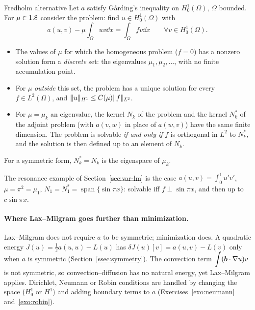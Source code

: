 \begin{gbox}{Fredholm alternative}
%
Let $a$ satisfy G\aa rding's inequality on $H^1_0(\Omega)$, $\Omega$ bounded.
For $\mu\in1.8$ consider the problem: find $u\in H^1_0(\Omega)$ with
\[
  a(u,v)-\mu\int_\Omega uv\dd x=\int_\Omega fv\dd x\qquad\forall v\in H^1_0(\Omega).
\]
\begin{itemize}
\item The values of $\mu$ for which the homogeneous problem ($f=0$) has a
nonzero solution form a \emph{discrete} set: the eigenvalues
$\mu_1,\mu_2,\dots$, with no finite accumulation point.
\item For $\mu$ \emph{outside} this set, the problem has a unique solution for
every $f\in L^2(\Omega)$, and $\lVert u\rVert_{H^1}\le C(\mu)\lVert f\rVert_{L^2}$.
\item For $\mu=\mu_k$ an eigenvalue, the kernel $N_k$ of the problem and the
kernel $N_k^\ast$ of the adjoint problem (with $a(v,w)$ in place of
$a(w,v)$) have the same finite dimension. The problem is solvable \emph{if
and only if} $f$ is orthogonal in $L^2$ to $N_k^\ast$, and the solution is
then defined up to an element of $N_k$.
\end{itemize}
For a symmetric form, $N_k^\ast=N_k$ is the eigenspace of $\mu_k$.
\end{gbox}
The resonance example of Section~\ref{sec:var-lm} is the case $\displaystyle a(u,v)=\int_0^1u'v'$,
$\mu=\pi^2=\mu_1$, $N_1=N_1^\ast=\operatorname{span}\{\sin\pi x\}$: solvable iff
$f\perp\sin\pi x$, and then up to $c\sin\pi x$.

\paragraph{Where Lax--Milgram goes further than minimization.} Lax--Milgram
%
does not require $a$ to be symmetric; minimization does. A quadratic energy
$J(u)=\tfrac12a(u,u)-L(u)$ has $\delta J(u)[v]=a(u,v)-L(v)$ only when $a$ is
symmetric (Section~\ref{ssec:symmetry}). The convection term
$\displaystyle \int(\bm{b}\cdot\nabla u)v$ is not symmetric, so convection--diffusion has no
natural energy, yet Lax--Milgram applies. Dirichlet, Neumann or Robin
conditions are handled by changing the space ($H^1_0$ or $H^1$) and adding
boundary terms to $a$ (Exercises~\ref{exo:neumann} and~\ref{exo:robin}).

